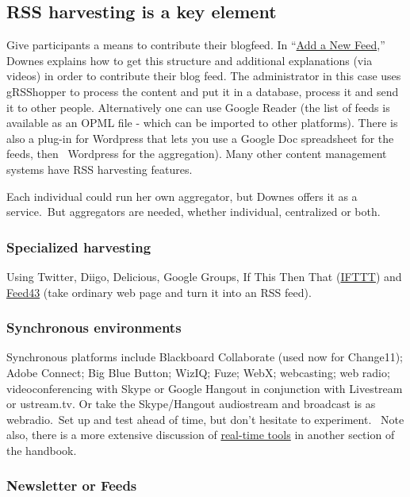 \subsection{RSS harvesting is a key element}

Give participants a means to contribute their blogfeed. In
``\href{http://change.mooc.ca/new_feed.htm}{Add a New Feed},'' Downes
explains how to get this structure and additional explanations (via
videos) in order to contribute their blog feed. The administrator in
this case uses gRSShopper to process the content and put it in a
database, process it and send it to other people. Alternatively one can
use Google Reader (the list of feeds is available as an OPML file -
which can be imported to other platforms). There is also a plug-in for
Wordpress that lets you use a Google Doc spreadsheet for the feeds, then
~Wordpress for the aggregation). Many other content management systems
have RSS harvesting features.

Each individual could run her own aggregator, but Downes offers it as a
service.~But aggregators are needed, whether individual, centralized or
both.

\subsubsection{Specialized harvesting}

Using Twitter, Diigo, Delicious, Google Groups, If This Then That
(\href{http://ifttt.com}{IFTTT}) and \href{http://feed43.com}{Feed43}
(take ordinary web page and turn it into an RSS feed).

\subsubsection{Synchronous environments}

Synchronous platforms include Blackboard Collaborate (used now for
Change11); Adobe Connect; Big Blue Button; WizIQ; Fuze; WebX;
webcasting; web radio; videoconferencing with Skype or Google Hangout in
conjunction with Livestream or ustream.tv. Or take the Skype/Hangout
audiostream and broadcast is as webradio.~Set up and test ahead of time,
but don't hesitate to experiment.~ Note also, there is a more extensive
discussion of \href{http://peeragogy.org/real-time-meetings/}{real-time
tools} in another section of the handbook.

\subsubsection{Newsletter or Feeds}

